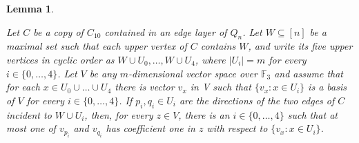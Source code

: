 \documentclass[10pt,a4paper]{amsart}
\newtheorem{lemma}{Lemma}
\begin{document}
\begin{lemma}\label{lemma: coefficient}

Let $C$ be a copy of $C_{10}$ contained in an edge layer of $Q_n$. 
Let $W \subseteq[n]$ be a maximal set such that each upper vertex of $C$
contains $W$, and write its five upper vertices in cyclic order as
$W \cup U_0, \ldots, W \cup U_4$, where $|U_i| = m$ for every $i \in \{0,\ldots, 4\}$. 
Let $V$ be any $m$-dimensional vector space over $\mathbb{F}_3$ and assume that for each $x \in U_0 \cup \ldots \cup U_4$ there is vector $v_x$ in V such that $\{v_x: x \in U_i\}$ is a basis of $V$ for every
$i \in \{0,\ldots,4\}$. 
If $p_i,q_i \in U_i$ are the directions of the two edges of $C$ incident
to $W \cup U_i$, then, for every $z \in V$, there is an $i \in \{0, \ldots, 4\}$ such that at most one of $v_{p_{i}}$ and $v_{q_{i}}$ has  coefficient one in $z$ with respect to $\{v_x : x \in U_i\}$.

\end{lemma}
\end{document}
